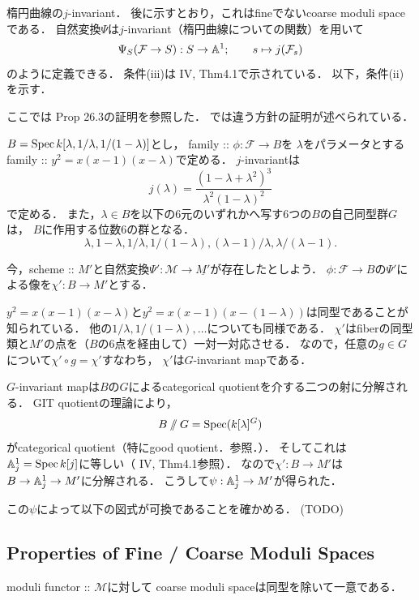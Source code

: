 \documentclass[a4paper]{jsarticle}
\newcommand{\famF}{\mathcal{F}}
\newcommand{\ftor}[1]{\underline{#1}}
\newcommand{\ftorM}{\mathcal{M}}
\begin{document}
    \begin{Example}
        楕円曲線の$j$-invariant．
        後に示すとおり，これはfineでないcoarse moduli spaceである．
        自然変換$\Psi$は$j$-invariant（楕円曲線についての関数）を用いて
        \[ \Psi_S(\famF \to S): S \to \affine^1; \qquad s \mapsto j(\famF_s) \]
        のように定義できる．
        条件(iii)は\cite{HarAG} IV, Thm4.1で示されている．
        以下，条件(ii)を示す．

        ここでは\cite{HarDef} Prop 26.3の証明を参照した．
        \cite{JTev}では違う方針の証明が述べられている．
        
        $B=\operatorname{Spec} k[\lambda, 1/\lambda, 1/(1-\lambda)]$とし，
        family :: $\phi: \famF \to B$を
        $\lambda$をパラメータとするfamily :: $y^2=x(x-1)(x-\lambda)$で定める．
        $j$-invariantは
        \[ j(\lambda)=\frac{(1-\lambda+\lambda^2)^3}{\lambda^2(1-\lambda)^2} \]
        で定める．
        また，$\lambda \in B$を以下の$6$元のいずれかへ写す$6$つの$B$の自己同型群$G$は，
        $B$に作用する位数$6$の群となる．
        \[ \lambda, 1-\lambda, 1/\lambda, 1/(1-\lambda), (\lambda-1)/\lambda, \lambda/(\lambda-1). \]

        今，scheme :: $M'$と自然変換$\Psi': \ftorM \to \ftor{M'}$が存在したとしよう．
        $\phi:\famF \to B$の$\Psi'$による像を$\chi': B \to M'$とする．

        $y^2=x(x-1)(x-\lambda)$と$y^2=x(x-1)(x-(1-\lambda))$は同型であることが知られている．
        他の$1/\lambda, 1/(1-\lambda), \dots$についても同様である．
        $\chi'$はfiberの同型類と$M'$の点を（$B$の$6$点を経由して）一対一対応させる．
        なので，任意の$g \in G$について$\chi' \circ g=\chi'$すなわち，
        $\chi'$は$G$-invariant mapである．

        $G$-invariant mapは$B$の$G$によるcategorical quotientを介する二つの射に分解される．
        GIT quotientの理論により，
        \[ B \sslash G=\operatorname{Spec} (k[\lambda]^G) \]
        がcategorical quotient（特にgood quotient．\cite{Hos}参照．）．
        そしてこれは$\mathbb{A}^1_{j}=\operatorname{Spec} k[j]$に等しい（\cite{HarAG} IV, Thm4.1参照）．
        なので$\chi': B \to M'$は$B \to \mathbb{A}^1_{j} \to M'$に分解される．
        こうして$\psi: \mathbb{A}^1_{j} \to M'$が得られた．

        この$\psi$によって以下の図式が可換であることを確かめる．
        (TODO)
    \end{Example}

    \subsection{Properties of Fine / Coarse Moduli Spaces}
    \begin{Prop}
        moduli functor :: $\ftorM$に対して
        coarse moduli spaceは同型を除いて一意である．
    \end{Prop}
\end{document}

